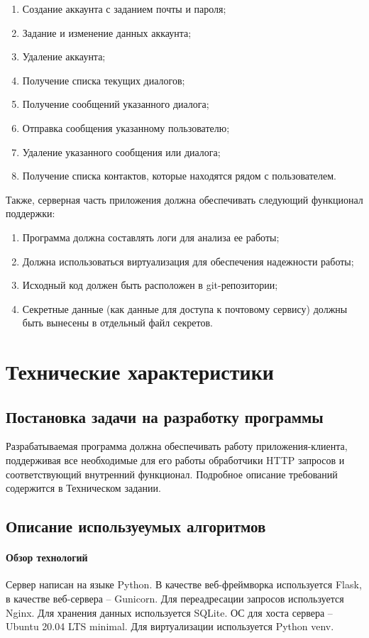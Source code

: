 \documentclass[explnote]{espd}
\begin{document}
\begin{enumerate}
\item Создание аккаунта с заданием почты и пароля;
\item Задание и изменение данных аккаунта;
\item Удаление аккаунта;
\item Получение списка текущих диалогов;
\item Получение сообщений указанного диалога;
\item Отправка сообщения указанному пользователю;
\item Удаление указанного сообщения или диалога;
\item Получение списка контактов, которые находятся рядом с пользователем.
\end{enumerate}

Также, серверная часть приложения должна обеспечивать следующий функционал поддержки:

\begin{enumerate}
\item Программа должна составлять логи для анализа ее работы;
\item Должна использоваться виртуализация для обеспечения надежности работы;
\item Исходный код должен быть расположен в git-репозитории;
\item Секретные данные (как данные для доступа к почтовому сервису) должны быть вынесены в отдельный файл секретов.
\end{enumerate}

\section{Технические характеристики}
\subsection{Постановка задачи на разработку программы}
Разрабатываемая программа должна обеспечивать работу приложения-клиента, поддерживая все необходимые для его работы обработчики HTTP запросов и соответствующий внутренний функционал. Подробное описание требований содержится в Техническом задании.

\subsection{Описание используеумых алгоритмов}
\paragraph{Обзор технологий}
Сервер написан на языке Python. В качестве веб-фреймворка используется Flask, в качестве веб-сервера -- Gunicorn. Для переадресации запросов используется Nginx. Для хранения данных используется SQLite. ОС для хоста сервера -- Ubuntu 20.04 LTS minimal. Для виртуализации используется Python venv.
\end{document}

